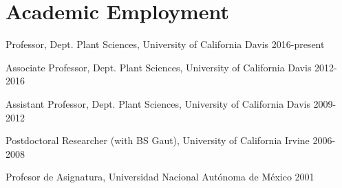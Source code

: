 \documentclass[letterpaper,10pt]{article}
\renewenvironment{itemize}{
  \begin{list}{}{
    \setlength{\leftmargin}{1.5em}
  }
}{
  \end{list}
}
\begin{document}
\section*{Academic Employment}
\begin{itemize}
\setlength\itemsep{0ex}
\item Professor, Dept. Plant Sciences, University of California Davis 2016-present
\item Associate Professor, Dept. Plant Sciences, University of California Davis 2012-2016
\item Assistant Professor, Dept. Plant Sciences, University of California Davis 2009-2012
\item Postdoctoral Researcher (with BS Gaut), University of California Irvine 2006-2008
\item Profesor de Asignatura, Universidad Nacional Aut\'{o}noma de M\'{e}xico 2001
\end{itemize}

\end{document}
